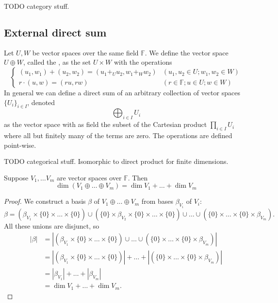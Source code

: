 TODO category stuff.

\subsection{External direct sum}
\begin{definition}
Let $U,W$ be vector spaces over the same field $\mathbb{F}$. We define the vector space  $U\oplus W$, called the , as the set $U\times W$ with the operations
\[ \begin{cases}
(u_1,w_1) + (u_2, w_2) = (u_1 +_U u_2, w_1 +_W w_2) & (u_1,u_2 \in U; w_1, w_2 \in W) \\
r\cdot (u,w) = (ru, rw) & (r\in \mathbb{F}; u\in U; w \in W)
\end{cases} \]
In general we can define a direct sum of an arbitrary collection of vector spaces $\{U_i\}_{i\in I}$, denoted
\[ \bigoplus_{i\in I}U_i \]
as the vector space with as field the subset of the Cartesian product $\prod_{i\in I}U_i$ where all but finitely many of the terms are zero. The operations are defined point-wise.
\end{definition}

TODO categorical stuff. Isomorphic to direct product for finite dimensions.

\begin{proposition}
Suppose $V_1, \ldots V_m$ are vector spaces over $\mathbb{F}$. Then
\[ \dim(V_1\oplus\ldots \oplus V_m) = \dim V_1 + \ldots + \dim V_m \]
\label{dimDirectSum}
\end{proposition}
\begin{proof}
We construct a basis $\beta$ of $V_1\oplus\ldots \oplus V_m$ from bases $\beta_{V_i}$ of $V_i$:
\[ \beta = (\beta_{V_1} \times \{0 \} \times \ldots \times \{0 \}) \cup (\{0 \} \times \beta_{V_2}\times \{0 \} \times \ldots \times \{0 \}) \cup \ldots \cup (\{0 \}\times \ldots \times \{0 \} \times \beta_{V_m}). \]
All these unions are disjunct, so
\begin{align*}
|\beta| &= |(\beta_{V_1} \times \{0 \} \times \ldots \times \{0 \}) \cup  \ldots \cup (\{0 \}\times \ldots \times \{0 \} \times \beta_{V_m})| \\
&= |(\beta_{V_1} \times \{0 \} \times \ldots \times \{0 \})| + \ldots + |(\{0 \}\times \ldots \times \{0 \} \times \beta_{V_m})| \\
&= | \beta_{V_1}| + \ldots + |\beta_{V_m}| \\
&= \dim V_1 + \ldots + \dim V_m.
\end{align*}
\end{proof}

